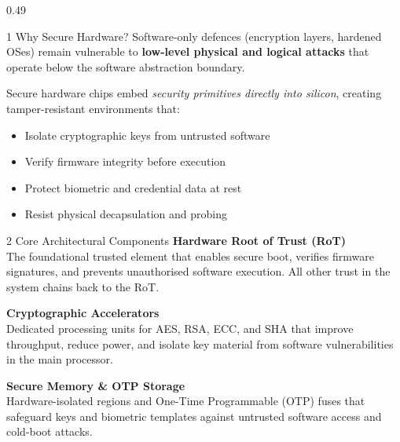 \documentclass[final]{beamer}
\begin{document}
\begin{frame}[t]

\begin{columns}[t,totalwidth=\linewidth]

\begin{column}{0.49\linewidth}

  \begin{block}{1 \; Why Secure Hardware?}
    Software-only defences (encryption layers, hardened OSes) remain
    vulnerable to \textbf{low-level physical and logical attacks} that
    operate below the software abstraction boundary.

    \medskip
    Secure hardware chips embed \emph{security primitives directly into
    silicon}, creating tamper-resistant environments that:
    \begin{itemize}[leftmargin=1em,itemsep=0.2ex]
      \item Isolate cryptographic keys from untrusted software
      \item Verify firmware integrity before execution
      \item Protect biometric and credential data at rest
      \item Resist physical decapsulation and probing
    \end{itemize}
  \end{block}

  \begin{block}{2 \; Core Architectural Components}
    \textbf{\color{AccentTeal}Hardware Root of Trust (RoT)}\\
    The foundational trusted element that enables secure boot, verifies
    firmware signatures, and prevents unauthorised software execution.
    All other trust in the system chains back to the RoT.

    \medskip
    \textbf{\color{AccentTeal}Cryptographic Accelerators}\\
    Dedicated processing units for AES, RSA, ECC, and SHA that improve
    throughput, reduce power, and isolate key material from software
    vulnerabilities in the main processor.

    \medskip
    \textbf{\color{AccentTeal}Secure Memory \& OTP Storage}\\
    Hardware-isolated regions and One-Time Programmable (OTP) fuses
    that safeguard keys and biometric templates against untrusted
    software access and cold-boot attacks.


\end{block}
\end{column}
\end{columns}
\end{frame}
\end{document}
